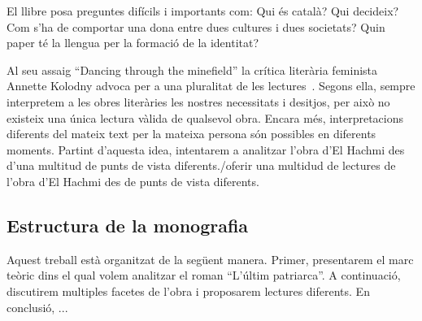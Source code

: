 El llibre posa preguntes difícils i importants com:
Qui és català? Qui decideix?
Com s'ha de comportar una dona entre dues cultures i dues societats?
Quin paper té la llengua per la formació de la identitat?

Al seu assaig ``Dancing through the minefield'' la crítica literària feminista Annette Kolodny advoca per a una pluralitat de les lectures~\autocite{Kolodny1980}.
Segons ella, sempre interpretem a les obres literàries les nostres necessitats i desitjos, per això no existeix una única lectura vàlida de qualsevol obra.
Encara més, interpretacions diferents del mateix text per la mateixa persona són possibles en diferents moments.
Partint d'aquesta idea, intentarem a analitzar l'obra d'El Hachmi des d'una multitud de punts de vista diferents./oferir una multidud de lectures de l'obra d'El Hachmi des de punts de vista diferents.

\subsection{Estructura de la monografia}
Aquest treball està organitzat de la següent manera.
Primer, presentarem el marc teòric dins el qual volem analitzar el roman ``L'últim patriarca''.
A continuació, discutirem multiples facetes de l'obra i proposarem lectures diferents.
En conclusió, ...

\begin{comment}
Fragestellung:
??
verschiedene readings anbieten:
* interseccionalitat
* translation/language
* laurie penny

--> adrienne rich/anette kolodny in die intro nehmen
Annette Kolodny: "In my view, our purpose is not and should not be the formulation of
any single reading method or potentially procrustean set of critical procedures[...] Instead, as I see it, our
task is to initiate nothing less than a playful pluralism, responsice to the possibilities of multiple critical
schools and methods, but captive of none.."

Leitfragen/themen:
* Qui és català? Qui decideix?
* La dona entre dues cultures i dues societats: expectacions, sentiments,... | interseccionalitat
* La dona en una societat machista                                           |
* coming-of-age
* el paper de la llengua

------

Motto candidates:

“The greatest masterpiece in literature is only a dictionary out of order.”
― Jean Cocteau
VA: Jean Cocteau once quipped that even the greatest masterpieces of literature are nothing but a
dictionary out of order.
(Stavans: Dictionaries Interview)

"IS: Every translation is a misrepresentation."
(Stavans: Dictionaries Interview)
\end{comment}
